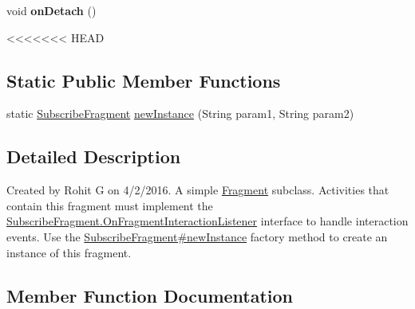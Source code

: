 \begin{DoxyCompactItemize}
\begin{DoxyCompactItemize}
\item 
\hypertarget{classcom_1_1example_1_1sel_1_1lostfound_1_1SubscribeFragment_a756f69f0e7f8f456fbbb077502d9494f}{void {\bfseries on\-Detach} ()}\label{classcom_1_1example_1_1sel_1_1lostfound_1_1SubscribeFragment_a756f69f0e7f8f456fbbb077502d9494f}

\end{DoxyCompactItemize}
<<<<<<< HEAD
\subsection*{Static Public Member Functions}
\begin{DoxyCompactItemize}
\item 
static \hyperlink{classcom_1_1example_1_1sel_1_1lostfound_1_1SubscribeFragment}{Subscribe\-Fragment} \hyperlink{classcom_1_1example_1_1sel_1_1lostfound_1_1SubscribeFragment_ac622c73212970653128ddfb06d38572a}{new\-Instance} (String param1, String param2)
\end{DoxyCompactItemize}


\subsection{Detailed Description}
Created by Rohit G on 4/2/2016. A simple \hyperlink{}{Fragment} subclass. Activities that contain this fragment must implement the \hyperlink{interfacecom_1_1example_1_1sel_1_1lostfound_1_1SubscribeFragment_1_1OnFragmentInteractionListener}{Subscribe\-Fragment.\-On\-Fragment\-Interaction\-Listener} interface to handle interaction events. Use the \hyperlink{classcom_1_1example_1_1sel_1_1lostfound_1_1SubscribeFragment_ac622c73212970653128ddfb06d38572a}{Subscribe\-Fragment\#new\-Instance} factory method to create an instance of this fragment. 

\subsection{Member Function Documentation}
\hypertarget{classcom_1_1example_1_1sel_1_1lostfound_1_1SubscribeFragment_ac622c73212970653128ddfb06d38572a}{
}
\end{DoxyCompactItemize}

